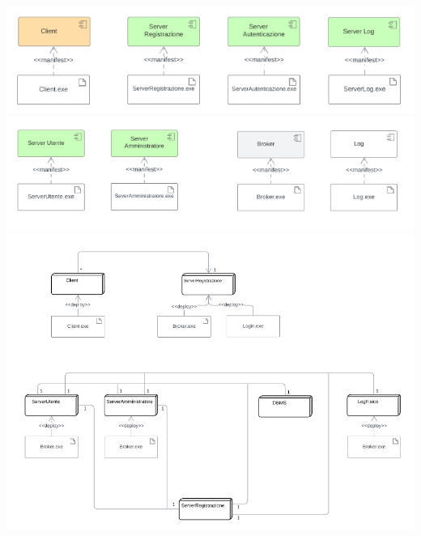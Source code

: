 \includegraphics[width=1\textwidth]{assets/img/deployment/artefatti-1.png}\\
\includegraphics[width=1\textwidth]{assets/img/deployment/artefatti-2.png}\\
\includegraphics[width=1\textwidth]{assets/img/deployment/deployment.png}\\